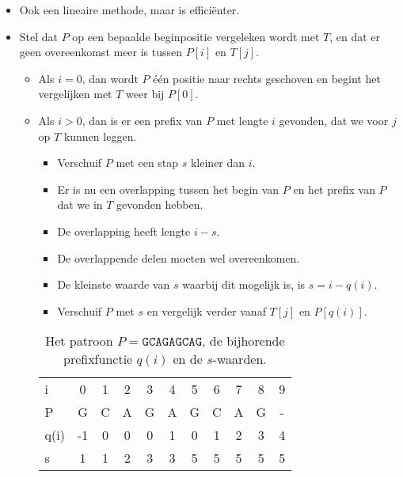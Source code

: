 \begin{itemize}
    \item Ook een lineaire methode, maar is efficiënter.
    \item Stel dat $P$ op een bepaalde beginpositie vergeleken wordt met $T$, en dat er geen overeenkomst meer is tussen $P[i]$ en $T[j]$.
    \begin{itemize}
        \item Als $i = 0$, dan wordt $P$ één positie naar rechts geschoven en begint het vergelijken met $T$ weer bij $P[0]$.
        \item Als $i > 0$, dan is er een prefix van $P$ met lengte $i$ gevonden, dat we voor $j$ op $T$ kunnen leggen.
        \begin{itemize}
            \item Verschuif $P$ met een stap $s$ kleiner dan $i$.
            \item Er is nu een overlapping tussen het begin van $P$ en het prefix van $P$ dat we in $T$ gevonden hebben.
            \item De overlapping heeft lengte $i - s$.
            \item De overlappende delen moeten wel overeenkomen.
            \item De kleinste waarde van $s$ waarbij dit mogelijk is, is $s = i - q(i)$.
            \item Verschuif $P$ met $s$ en vergelijk verder vanaf $T[j]$ en $P[q(i)]$.
        \end{itemize}
        \begin{table}[ht]
            \centering
            \begin{tabular}{l | c c c c c c c c c c}
                i   & 0 & 1 & 2 & 3 & 4 & 5 & 6 & 7 & 8 & 9\\
                P   & G & C & A & G & A & G & C & A & G & - \\
                    \hline
                q(i) & -1 & 0 & 0 & 0 & 1 & 0 & 1 & 2 & 3 & 4 \\
                s   & 1 & 1 & 2 & 3 & 3 & 5 & 5 & 5 & 5 & 5
            \end{tabular}
            \caption{Het patroon $P = \texttt{GCAGAGCAG}$, de bijhorende prefixfunctie $q(i)$ en de $s$-waarden.}
            \label{table:kmp1}
        \end{table}


\end{itemize}
\end{itemize}
